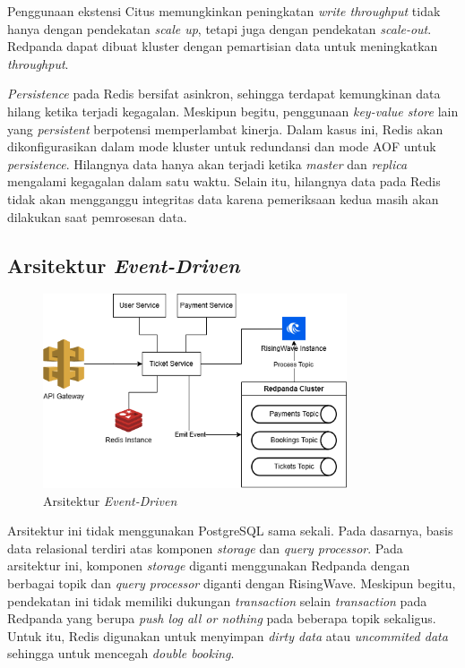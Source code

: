 Penggunaan ekstensi Citus memungkinkan peningkatan \textit{write throughput} tidak hanya dengan pendekatan \textit{scale up}, tetapi juga dengan pendekatan \textit{scale-out}. Redpanda dapat dibuat kluster dengan pemartisian data untuk meningkatkan \textit{throughput}.

\textit{Persistence} pada Redis bersifat asinkron, sehingga terdapat kemungkinan data hilang ketika terjadi kegagalan. Meskipun begitu, penggunaan \textit{key-value store} lain yang \textit{persistent} berpotensi memperlambat kinerja. Dalam kasus ini, Redis akan dikonfigurasikan dalam mode kluster untuk redundansi dan mode AOF untuk \textit{persistence}. Hilangnya data hanya akan terjadi ketika \textit{master} dan \textit{replica} mengalami kegagalan dalam satu waktu. Selain itu, hilangnya data pada Redis tidak akan mengganggu integritas data karena pemeriksaan kedua masih akan dilakukan saat pemrosesan data.

\subsection{Arsitektur \textit{Event-Driven}}

\begin{figure}[ht]
    \centering
    \includegraphics[width=0.8\textwidth]{resources/chapter-3/architecture-event-driven.png}
    \caption{Arsitektur \textit{Event-Driven}}
    \label{fig:solution-event-driven-architecture}
\end{figure}

Arsitektur ini tidak menggunakan PostgreSQL sama sekali. Pada dasarnya, basis data relasional terdiri atas komponen \textit{storage} dan \textit{query processor}. Pada arsitektur ini, komponen \textit{storage} diganti menggunakan Redpanda dengan berbagai topik dan \textit{query processor} diganti dengan RisingWave. Meskipun begitu, pendekatan ini tidak memiliki dukungan \textit{transaction} selain \textit{transaction} pada Redpanda yang berupa \textit{push log all or nothing} pada beberapa topik sekaligus. Untuk itu, Redis digunakan untuk menyimpan \textit{dirty data} atau \textit{uncommited data} sehingga untuk mencegah \textit{double booking}.

